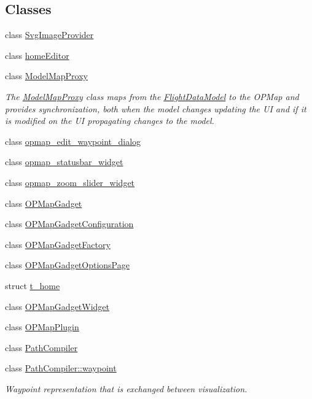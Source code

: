 \subsection*{Classes}
\begin{DoxyCompactItemize}
\item 
class \hyperlink{class_svg_image_provider}{Svg\-Image\-Provider}
\item 
class \hyperlink{classhome_editor}{home\-Editor}
\item 
class \hyperlink{class_model_map_proxy}{Model\-Map\-Proxy}
\begin{DoxyCompactList}\small\item\em The \hyperlink{class_model_map_proxy}{Model\-Map\-Proxy} class maps from the \hyperlink{class_flight_data_model}{Flight\-Data\-Model} to the O\-P\-Map and provides synchronization, both when the model changes updating the U\-I and if it is modified on the U\-I propagating changes to the model. \end{DoxyCompactList}\item 
class \hyperlink{classopmap__edit__waypoint__dialog}{opmap\-\_\-edit\-\_\-waypoint\-\_\-dialog}
\item 
class \hyperlink{classopmap__statusbar__widget}{opmap\-\_\-statusbar\-\_\-widget}
\item 
class \hyperlink{classopmap__zoom__slider__widget}{opmap\-\_\-zoom\-\_\-slider\-\_\-widget}
\item 
class \hyperlink{class_o_p_map_gadget}{O\-P\-Map\-Gadget}
\item 
class \hyperlink{class_o_p_map_gadget_configuration}{O\-P\-Map\-Gadget\-Configuration}
\item 
class \hyperlink{class_o_p_map_gadget_factory}{O\-P\-Map\-Gadget\-Factory}
\item 
class \hyperlink{class_o_p_map_gadget_options_page}{O\-P\-Map\-Gadget\-Options\-Page}
\item 
struct \hyperlink{structt__home}{t\-\_\-home}
\item 
class \hyperlink{class_o_p_map_gadget_widget}{O\-P\-Map\-Gadget\-Widget}
\item 
class \hyperlink{class_o_p_map_plugin}{O\-P\-Map\-Plugin}
\item 
class \hyperlink{class_path_compiler}{Path\-Compiler}
\item 
class \hyperlink{class_path_compiler_1_1waypoint}{Path\-Compiler\-::waypoint}
\begin{DoxyCompactList}\small\item\em Waypoint representation that is exchanged between visualization. \end{DoxyCompactList}\item 

\end{DoxyCompactItemize}
